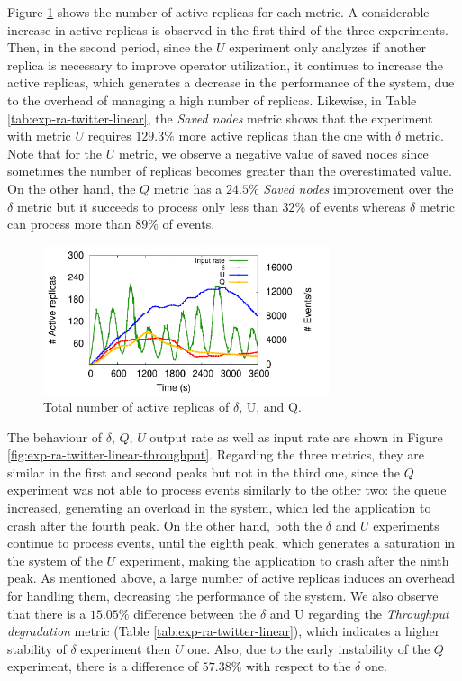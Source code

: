 Figure \ref{fig:exp-ra-twitter-linear-replicas} shows the number of active replicas for each metric. A considerable increase in active replicas is observed in the first third of the three experiments. Then, in the second period, since the $U$ experiment only analyzes if another replica is necessary to improve operator utilization, it continues to increase the active replicas, which generates a decrease in the performance of the system, due to the overhead of managing a high number of replicas. Likewise, in Table \ref{tab:exp-ra-twitter-linear}, the \textit{Saved nodes} metric shows that the experiment with metric $U$ requires $129.3\%$ more active replicas than the one with $\delta$ metric. Note that for the $U$ metric, we observe a negative value of saved nodes since sometimes the number of replicas becomes greater than the overestimated value. On the other hand, the  $Q$ metric has a $24.5\%$ \textit{Saved nodes} improvement over the $\delta$ metric but it succeeds to process only less than $32\%$ of events whereas $\delta$ metric can process more than $89\%$ of events.

\begin{figure}[!ht]
    \centering
    \includegraphics[width=0.75\textwidth]{figures/exp/reactive/TwitterLinear-Replicas.pdf}
    \caption{Total number of active replicas of $\delta$, U, and Q.}
    \label{fig:exp-ra-twitter-linear-replicas}
\end{figure}

The behaviour of $\delta$, $Q$, $U$ output rate as well as input rate are shown in Figure \ref{fig:exp-ra-twitter-linear-throughput}. Regarding the three metrics, they are similar in the first and second peaks but not in the third one, since the $Q$ experiment was not able to process events similarly to the other two: the queue increased, generating an overload in the system, which led the application to crash after the fourth peak. On the other hand, both the $ \delta $ and $U$ experiments continue to process events, until the eighth peak, which generates a saturation in the system of the $U$ experiment, making the application to crash after the ninth peak. As mentioned above, a large number of active replicas induces an overhead for handling them, decreasing the performance of the system. We also observe that there is a $15.05\%$ difference between the $ \delta $ and U regarding the \textit{Throughput degradation} metric (Table \ref{tab:exp-ra-twitter-linear}), which indicates a higher stability of  $ \delta $ experiment then $U$ one. Also, due to the early instability of the $Q$ experiment, there is a difference of $57.38\%$ with respect to the $ \delta $ one. 

